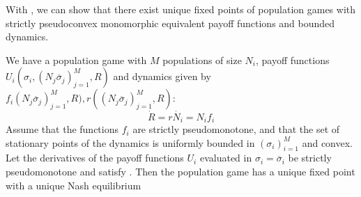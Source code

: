 With , we can show that there exist unique fixed points of population games with strictly pseudoconvex monomorphic equivalent payoff functions and bounded dynamics.
\begin{theorem}
  \label{thm:pop_game_exists_unique}
  We have a population game with $M$ populations of size $N_i$, payoff functions $U_i(\sigma_i, (N_j \overbar{\sigma}_j)_{j=1}^M, R)$ and dynamics given by $f_i(N_j \overbar{\sigma}_j)_{j=1}^M, R),r((N_j \overbar{\sigma}_j)_{j=1}^M, R)$:
  \begin{equation}
    \dot{R} = r
    \dot{N_i} = N_i f_i
  \end{equation}
  Assume that the functions $f_i$ are strictly pseudomonotone, and that the set of stationary points of the dynamics is uniformly bounded in $(\sigma_i)_{i=1}^M$ and convex. Let the derivatives of the payoff functions $U_i$ evaluated in $\sigma_i = \overbar{\sigma}_i$ be strictly pseudomonotone and satisfy . Then the population game has a unique fixed point with a unique Nash equilibrium
\end{theorem}
